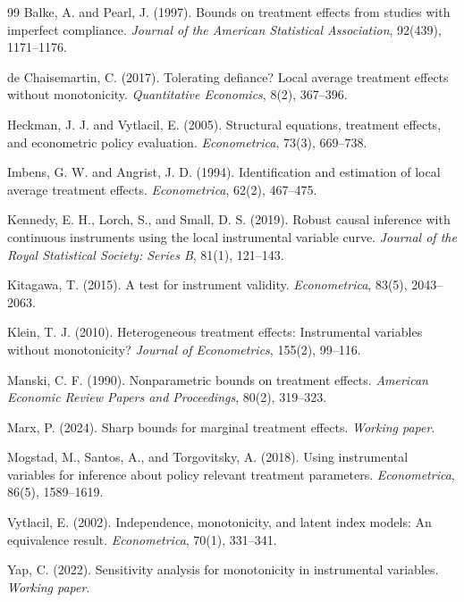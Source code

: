 \documentclass[11pt]{article}
\theoremstyle{definition}
\theoremstyle{plain}
\theoremstyle{remark}
\begin{document}
\begin{thebibliography}{99}
Balke, A. and Pearl, J. (1997).
Bounds on treatment effects from studies with imperfect compliance.
\emph{Journal of the American Statistical Association}, 92(439), 1171--1176.

de Chaisemartin, C. (2017).
Tolerating defiance? Local average treatment effects without monotonicity.
\emph{Quantitative Economics}, 8(2), 367--396.

Heckman, J. J. and Vytlacil, E. (2005).
Structural equations, treatment effects, and econometric policy evaluation.
\emph{Econometrica}, 73(3), 669--738.

Imbens, G. W. and Angrist, J. D. (1994).
Identification and estimation of local average treatment effects.
\emph{Econometrica}, 62(2), 467--475.

Kennedy, E. H., Lorch, S., and Small, D. S. (2019).
Robust causal inference with continuous instruments using the local instrumental variable curve.
\emph{Journal of the Royal Statistical Society: Series B}, 81(1), 121--143.

Kitagawa, T. (2015).
A test for instrument validity.
\emph{Econometrica}, 83(5), 2043--2063.

Klein, T. J. (2010).
Heterogeneous treatment effects: Instrumental variables without monotonicity?
\emph{Journal of Econometrics}, 155(2), 99--116.

Manski, C. F. (1990).
Nonparametric bounds on treatment effects.
\emph{American Economic Review Papers and Proceedings}, 80(2), 319--323.

Marx, P. (2024).
Sharp bounds for marginal treatment effects.
\emph{Working paper}.

Mogstad, M., Santos, A., and Torgovitsky, A. (2018).
Using instrumental variables for inference about policy relevant treatment parameters.
\emph{Econometrica}, 86(5), 1589--1619.

Vytlacil, E. (2002).
Independence, monotonicity, and latent index models: An equivalence result.
\emph{Econometrica}, 70(1), 331--341.

Yap, C. (2022).
Sensitivity analysis for monotonicity in instrumental variables.
\emph{Working paper}.
\end{thebibliography}
\end{document}
